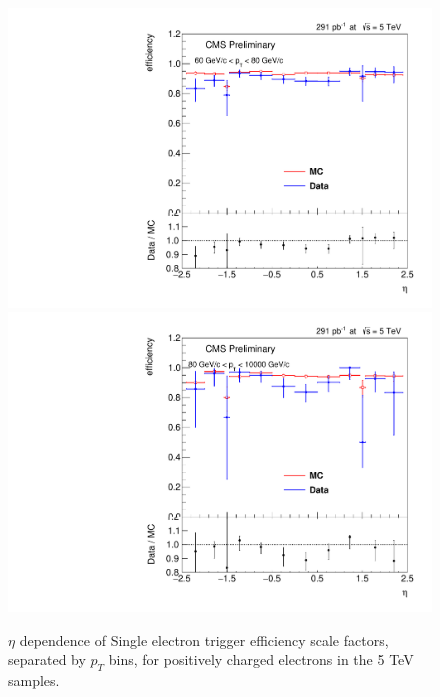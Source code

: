 \begin{figure}
\includegraphics[width=0.45\linewidth]{plots/efficiency/5_zeehlt_positive/PtBins_eta_pt10.pdf}
\includegraphics[width=0.45\linewidth]{plots/efficiency/5_zeehlt_positive/PtBins_eta_pt11.pdf}
\caption{$\eta$ dependence of Single electron trigger efficiency scale factors, separated by $p_T$ bins, for positively charged electrons in the 5 TeV samples.}
\label{fig:Eff:el:5:HLT:pos}
\end{figure}
